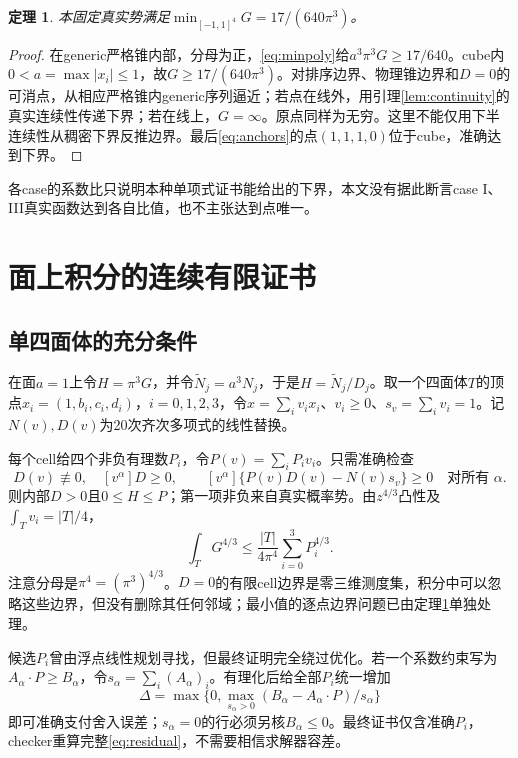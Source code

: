 \documentclass[UTF8,11pt,a4paper,fontset=fandol]{ctexart}
\newtheorem{theorem}{定理}[section]
\theoremstyle{remark}\newtheorem{remark}[theorem]{注}
\newcommand{\1}{\mathbf1}\newcommand{\pos}[1]{(#1)_+}
\begin{document}
\begin{theorem}\label{thm:min}
本固定真实势满足$\min_{[-1,1]^4}G=17/(640\pi^3)$。
\end{theorem}
\begin{proof}
在generic严格锥内部，分母为正，\eqref{eq:minpoly}给$a^3\pi^3G\ge17/640$。cube内$0<a=\max|x_i|\le1$，故$G\ge17/(640\pi^3)$。对排序边界、物理锥边界和$D=0$的可消点，从相应严格锥内generic序列逼近；若点在线外，用引理\ref{lem:continuity}的真实连续性传递下界；若在线上，$G=\infty$。原点同样为无穷。这里不能仅用下半连续性从稠密下界反推边界。最后\eqref{eq:anchors}的点$(1,1,1,0)$位于cube，准确达到下界。
\end{proof}
各case的系数比只说明本种单项式证书能给出的下界，本文没有据此断言case I、III真实函数达到各自比值，也不主张达到点唯一。

\section{面上积分的连续有限证书}
\subsection{单四面体的充分条件}
在面$a=1$上令$H=\pi^3G$，并令$\widetilde N_j=a^3N_j$，于是$H=\widetilde N_j/D_j$。取一个四面体$T$的顶点$x_i=(1,b_i,c_i,d_i)$，$i=0,1,2,3$，令$x=\sum_i v_ix_i$、$v_i\ge0$、$s_v=\sum_i v_i=1$。记$N(v),D(v)$为20次齐次多项式的线性替换。

每个cell给四个非负有理数$P_i$，令$P(v)=\sum_iP_iv_i$。只需准确检查
\begin{equation}\label{eq:residual}
 D(v)\not\equiv0,\quad [v^\alpha]D\ge0,\qquad
 [v^\alpha]\{P(v)D(v)-N(v)s_v\}\ge0\quad\text{对所有 }\alpha.
\end{equation}
则内部$D>0$且$0\le H\le P$；第一项非负来自真实概率势。由$z^{4/3}$凸性及$\int_Tv_i=|T|/4$，
\begin{equation}\label{eq:tetbudget}
 \int_TG^{4/3}\le\frac{|T|}{4\pi^4}\sum_{i=0}^3P_i^{4/3}.
\end{equation}
注意分母是$\pi^4=(\pi^3)^{4/3}$。$D=0$的有限cell边界是零三维测度集，积分中可以忽略这些边界，但没有删除其任何邻域；最小值的逐点边界问题已由定理\ref{thm:min}单独处理。

候选$P_i$曾由浮点线性规划寻找，但最终证明完全绕过优化。若一个系数约束写为$A_\alpha\cdot P\ge B_\alpha$，令$s_\alpha=\sum_i(A_\alpha)_i$。有理化后给全部$P_i$统一增加
\[
 \Delta=\max\{0,\max_{s_\alpha>0}(B_\alpha-A_\alpha\cdot P)/s_\alpha\}
\]
即可准确支付舍入误差；$s_\alpha=0$的行必须另核$B_\alpha\le0$。最终证书仅含准确$P_i$，checker重算完整\eqref{eq:residual}，不需要相信求解器容差。
\end{document}
